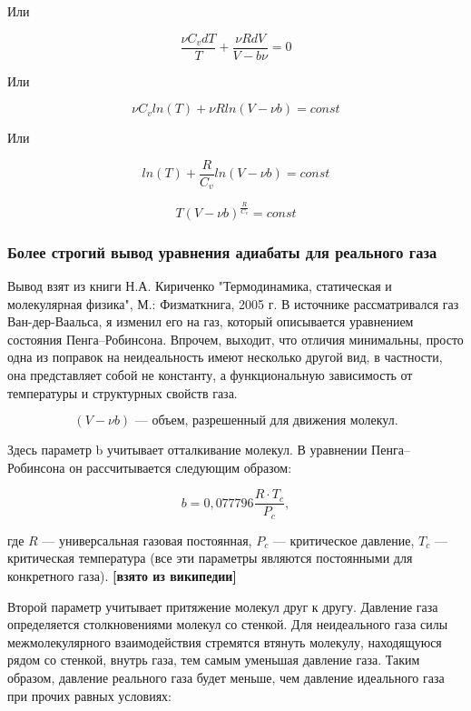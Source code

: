 \documentclass[a4paper,14pt]{article}
\theoremstyle{plain} %
\theoremstyle{definition} %
\theoremstyle{remark} %
\begin{document}
Или 

\begin{equation}
	\frac{\nu C_v d T}{T} + \frac{\nu R d V}{V - b \nu} = 0
\end{equation}

Или

\begin{equation}
	\nu C_v ln (T) + \nu R ln (V - \nu b) = const
\end{equation}

Или 

\begin{equation}
	ln (T) + \frac{R}{C_v} ln (V - \nu b) = const
\end{equation}

\begin{equation}
	T(V - \nu b)^{\frac{R}{C_v}} = const
\end{equation}

\newpage

\subsubsection{Более строгий вывод уравнения адиабаты для реального газа}

Вывод взят из книги Н.А. Кириченко "Термодинамика, статическая и молекулярная физика", М.: Физматкнига, 2005 г. В источнике рассматривался газ Ван-дер-Ваальса, я изменил его на газ, который описывается уравнением состояния Пенга--Робинсона. Впрочем, выходит, что отличия минимальны, просто одна из поправок на неидеальность имеют несколько другой вид, в частности, она представляет собой не константу, а функциональную зависимость от температуры и структурных свойств газа.

$$ (V - \nu b) \textrm{ --- объем, разрешенный для движения молекул.}$$

Здесь параметр b учитывает отталкивание молекул. В уравнении Пенга--Робинсона он рассчитывается следующим образом:

$$ b = 0,077796 \frac{R \cdot T_c}{P_c}, $$

где $R$ --- универсальная газовая постоянная, $P_c$ --- критическое давление, $T_c$ --- критическая температура (все эти параметры являются постоянными для конкретного газа). \textbf{[взято из википедии]}

Второй параметр учитывает притяжение молекул друг к другу. Давление газа определяется столкновениями молекул со стенкой. Для неидеального газа силы межмолекулярного взаимодействия стремятся втянуть молекулу, находящуюся рядом со стенкой, внутрь газа, тем самым уменьшая давление газа. Таким образом, давление реального газа будет меньше, чем давление идеального газа при прочих равных условиях:
\end{document}
